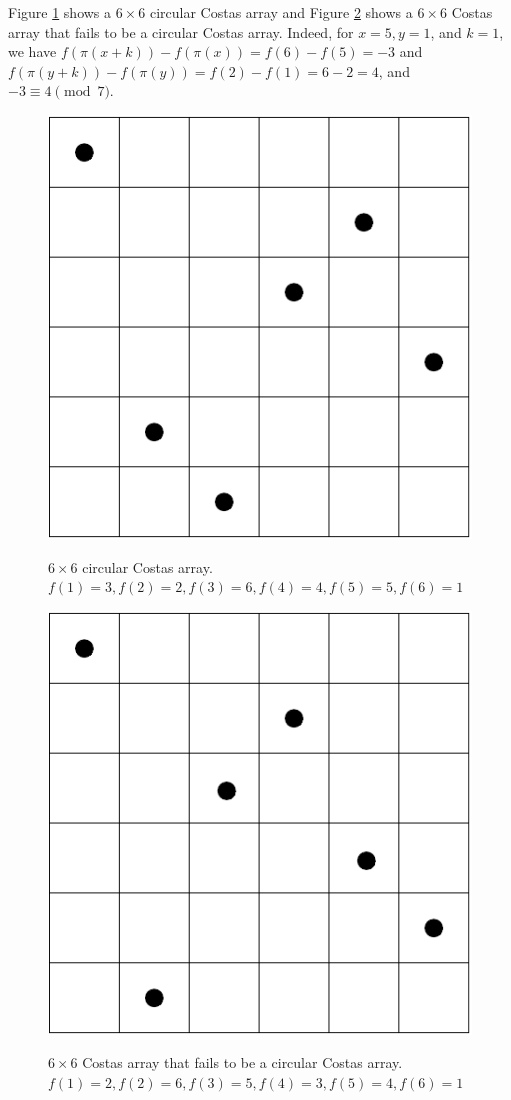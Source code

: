 \documentclass[10pt]{amsart}
\begin{document}
Figure \ref{figure:6x6circular} shows a $6 \times 6$ circular Costas array
and Figure \ref{figure:6x6} shows a $6\times 6$ Costas array that fails to be
a circular Costas array. Indeed, for $x=5, y=1$, and $k=1$, we have
$f(\pi(x+k))-f(\pi(x))=f(6)-f(5)=-3$ and $f(\pi(y+k))-f(\pi(y))
=f(2)-f(1)=6-2=4$, and $-3 \equiv 4 \pmod{7}$.

\begin{figure}
\caption{$6\times 6$ circular Costas array. $f(1)=3,f(2)=2,f(3)=6,f(4)=4,
f(5)=5,f(6)=1$}
\includegraphics[scale=0.75,angle=-90]{6x6circular}
\label{figure:6x6circular}
\end{figure}

\begin{figure}
\caption{$6 \times 6$ Costas array that fails to be a circular Costas array.
$f(1)=2,f(2)=6,f(3)=5,f(4)=3,f(5)=4,f(6)=1$}
\includegraphics[scale=0.75,angle=-90]{6x6}
\label{figure:6x6}
\end{figure}
\end{document}
